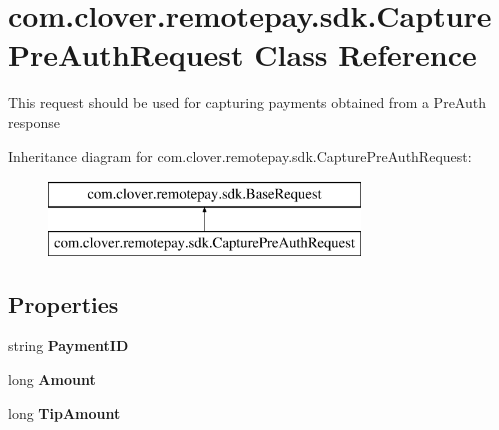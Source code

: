 \hypertarget{classcom_1_1clover_1_1remotepay_1_1sdk_1_1_capture_pre_auth_request}{}\section{com.\+clover.\+remotepay.\+sdk.\+Capture\+Pre\+Auth\+Request Class Reference}
\label{classcom_1_1clover_1_1remotepay_1_1sdk_1_1_capture_pre_auth_request}


This request should be used for capturing payments obtained from a Pre\+Auth response  


Inheritance diagram for com.\+clover.\+remotepay.\+sdk.\+Capture\+Pre\+Auth\+Request\+:\begin{figure}[H]
\begin{center}
\leavevmode
\includegraphics[height=2.000000cm]{classcom_1_1clover_1_1remotepay_1_1sdk_1_1_capture_pre_auth_request}
\end{center}
\end{figure}
\subsection*{Properties}
\begin{DoxyCompactItemize}
\item 
\mbox{\label{classcom_1_1clover_1_1remotepay_1_1sdk_1_1_capture_pre_auth_request_a3a7fb8ce574a713d201a3d218f2199fd}} 
string {\bfseries Payment\+ID}
\item 
\mbox{\label{classcom_1_1clover_1_1remotepay_1_1sdk_1_1_capture_pre_auth_request_a4ae0d0f91cf6dbca14b63a47e2e841b0}} 
long {\bfseries Amount}
\item 
\mbox{\label{classcom_1_1clover_1_1remotepay_1_1sdk_1_1_capture_pre_auth_request_a5a34025a2bb189f2458ea17796565fe7}} 
long {\bfseries Tip\+Amount}
\end{DoxyCompactItemize}


